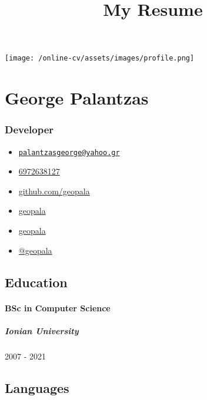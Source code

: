 \documentclass[english,]{article}
\title{My Resume}
\date{}
\providecommand{\tightlist}{%
  \setlength{\itemsep}{0pt}\setlength{\parskip}{0pt}}
\let\oldparagraph\paragraph
\renewcommand{\paragraph}[1]{\oldparagraph{#1}\mbox{}}
\let\oldsubparagraph\subparagraph
\renewcommand{\subparagraph}[1]{\oldsubparagraph{#1}\mbox{}}
\begin{document}
\maketitle

\texttt{[image: /online-cv/assets/images/profile.png]}

\hypertarget{george-palantzas}{%
\section{George Palantzas}\label{george-palantzas}}

\hypertarget{developer}{%
\subsubsection{Developer}\label{developer}}

\begin{itemize}
\tightlist
\item
  \emph{}
  \href{mailto:palantzasgeorge@yahoo.gr}{\nolinkurl{palantzasgeorge@yahoo.gr}}
\item
  \emph{} \href{tel:6972638127}{6972638127}
\item
  \emph{} \href{http://github.com/geopala}{github.com/geopala}
\item
  \emph{} \href{https://linkedin.com/in/geopala}{geopala}
\item
  \emph{} \href{http://github.com/geopala}{geopala}
\item
  \emph{} \href{https://twitter.com/@geopala}{@geopala}
\end{itemize}

\hypertarget{education}{%
\subsection{Education}\label{education}}

\hypertarget{bsc-in-computer-science}{%
\paragraph{BSc in Computer Science}\label{bsc-in-computer-science}}

\hypertarget{ionian-university}{%
\subparagraph{Ionian University}\label{ionian-university}}

2007 - 2021

\hypertarget{languages}{%
\subsection{Languages}\label{languages}}
\end{document}
